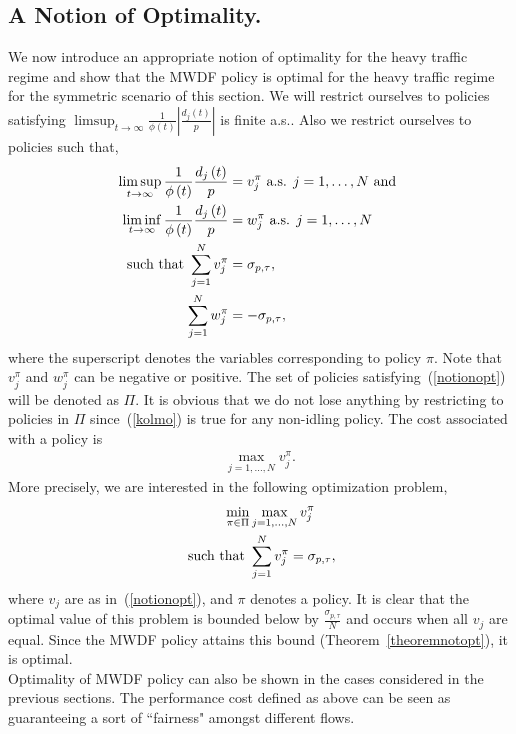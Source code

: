 \documentclass[letterpaper, 10 pt, conference]{ieeeconf}
\begin{document}
\subsection{A Notion of Optimality.}
We now introduce an appropriate notion of optimality for the heavy traffic regime and show that the MWDF policy is optimal for the heavy traffic regime for the symmetric scenario of this section. We will restrict ourselves to policies satisfying $\limsup_{t\to\infty} \frac{1}{\phi\left(t\right)}\left|\frac{d_{j}\left(t\right)}{p} \right| $ is finite a.s.. Also we restrict ourselves to policies such that, 
\begin{align}\label{notionopt}
\limsup_{t\to\infty} \frac{1}{\phi\left(t\right)}\frac{d_{j}\left(t\right)}{p} &= v^{\pi}_{j} \mbox{ a.s. } j = 1,\ldots,N \mbox{ and }\notag\\
\liminf_{t\to\infty} \frac{1}{\phi\left(t\right)}\frac{d_{j}\left(t\right)}{p} &= w^{\pi}_{j}\mbox{ a.s. }  j = 1,\ldots,N \notag\\
\mbox{ such that } \sum_{j=1}^{N} v^{\pi}_{j} &= \sigma_{p,\tau},\notag\\
\qquad \sum_{j=1}^{N} w^{\pi}_{j} &= -\sigma_{p,\tau},
\end{align}
where the superscript denotes the variables corresponding to policy $\pi$. Note that $v^{\pi}_{j}$ and $w^{\pi}_{j}$ can be negative or positive. The set of policies satisfying~(\ref{notionopt}) will be denoted as $\Pi$. It is obvious that we do not lose anything by restricting to policies in $\Pi$ since~(\ref{kolmo}) is true for any non-idling policy. The cost associated with a policy is
\begin{align*}
\max_{j=1,\ldots,N}v^{\pi}_{j}.
\end{align*} 
More precisely, we are interested in the following optimization problem,
\begin{align}\label{cost}
\min_{\pi\in\Pi} &\max_{j=1,\ldots,N} v^{\pi}_{j}\notag\\
\mbox{ such that }& \sum_{j=1}^{N}v^{\pi}_{j} = \sigma_{p,\tau},
\end{align}
where $v_{j}$ are as in~(\ref{notionopt}), and $\pi$ denotes a policy. It is clear that the optimal value of this problem is bounded below by $\frac{\sigma_{p,\tau}}{N}$ and occurs when all $v_{j}$ are equal. Since the MWDF policy attains this bound (Theorem~\ref{theoremnotopt}), it is optimal.\\
Optimality of MWDF policy can also be shown in the cases considered in the previous sections. The performance cost defined as above can be seen as guaranteeing a sort of ``fairness" amongst different flows.
\end{document}
